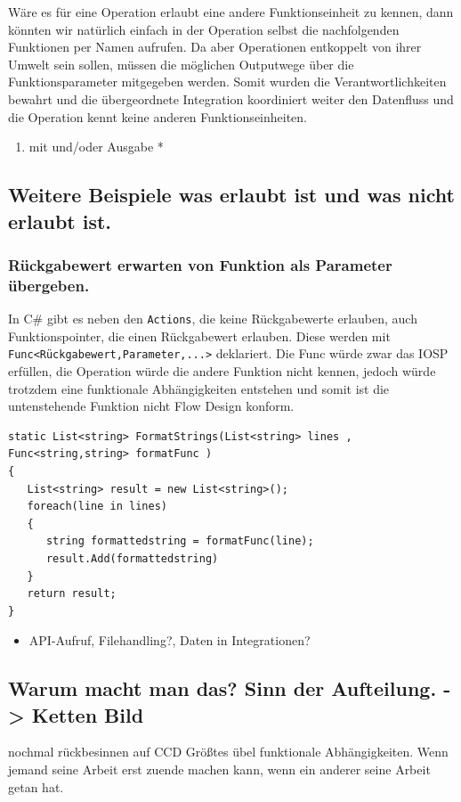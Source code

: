 \documentclass[11pt]{article}
\begin{document}
Wäre es für eine Operation erlaubt eine andere Funktionseinheit zu kennen, dann könnten wir natürlich einfach in der Operation selbst
die nachfolgenden Funktionen per Namen aufrufen. Da aber Operationen entkoppelt von ihrer Umwelt sein sollen, müssen die möglichen
Outputwege über die Funktionsparameter mitgegeben werden. Somit wurden die Verantwortlichkeiten bewahrt und die übergeordnete 
Integration koordiniert weiter den Datenfluss und die Operation kennt keine anderen Funktionseinheiten.


\begin{enumerate}
\item mit und/oder Ausgabe
\label{sec:orgheadline31}
*
\end{enumerate}
\subsection{Weitere Beispiele was erlaubt ist und was nicht erlaubt ist.}
\label{sec:orgheadline35}
\subsubsection{Rückgabewert erwarten von Funktion als Parameter übergeben.}
\label{sec:orgheadline34}
In C\# gibt es neben den \texttt{Actions}, die keine Rückgabewerte erlauben, auch Funktionspointer, die einen Rückgabewert erlauben. 
Diese werden mit \texttt{Func<Rückgabewert,Parameter,...>} deklariert.
Die Func würde zwar das IOSP erfüllen, die Operation würde die andere Funktion nicht kennen,
jedoch würde trotzdem eine funktionale Abhängigkeiten entstehen und somit ist die untenstehende Funktion nicht Flow Design konform.

\begin{verbatim}
static List<string> FormatStrings(List<string> lines , Func<string,string> formatFunc )
{
   List<string> result = new List<string>();
   foreach(line in lines)
   {
      string formattedstring = formatFunc(line);
      result.Add(formattedstring) 
   }
   return result;
}
\end{verbatim}


\begin{itemize}
\item API-Aufruf, Filehandling?, Daten in Integrationen?
\end{itemize}
\subsection{Warum macht man das? Sinn der Aufteilung. -> Ketten Bild}
\label{sec:orgheadline36}
nochmal rückbesinnen auf CCD
Größtes übel funktionale Abhängigkeiten.
Wenn jemand seine Arbeit erst zuende machen kann, wenn ein anderer seine Arbeit getan hat.
\end{document}
